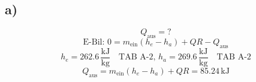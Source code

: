 

\subsection*{a)}
\[
Q_{\text{aus}} = ?
\]
\[
\text{E-Bil: } 0 = m_{\text{ein}} (h_e - h_a) + QR - Q_{\text{aus}}
\]
\[
h_e = 262.6 \, \frac{\text{kJ}}{\text{kg}} \quad \text{TAB A-2, } h_a = 269.6 \, \frac{\text{kJ}}{\text{kg}} \quad \text{TAB A-2}
\]
\[
Q_{\text{aus}} = m_{\text{ein}} (h_e - h_a) + QR = 85.24 \, \text{kJ}
\]